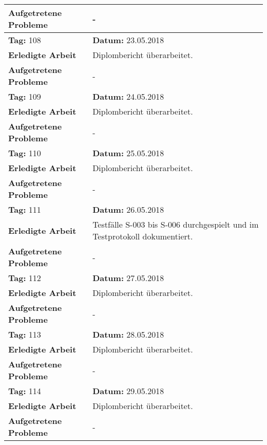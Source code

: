 \begin{longtable}{|p{5cm}|p{5cm}p{6cm}|}
\textbf{Aufgetretene Probleme} & \multicolumn{2}{p{11cm}|}{-} \\ \hline
\rowcolor{heading}\textbf{Tag:} 108 & \textbf{Datum:} 23.05.2018 & \\ \hline
\textbf{Erledigte Arbeit} & \multicolumn{2}{p{11cm}|}{Diplombericht überarbeitet.} \\ \hline
\textbf{Aufgetretene Probleme} & \multicolumn{2}{p{11cm}|}{-} \\ \hline
\rowcolor{heading}\textbf{Tag:} 109 & \textbf{Datum:} 24.05.2018 & \\ \hline
\textbf{Erledigte Arbeit} & \multicolumn{2}{p{11cm}|}{Diplombericht überarbeitet.} \\ \hline
\textbf{Aufgetretene Probleme} & \multicolumn{2}{p{11cm}|}{-} \\ \hline
\rowcolor{heading}\textbf{Tag:} 110 & \textbf{Datum:} 25.05.2018 & \\ \hline
\textbf{Erledigte Arbeit} & \multicolumn{2}{p{11cm}|}{Diplombericht überarbeitet.} \\ \hline
\textbf{Aufgetretene Probleme} & \multicolumn{2}{p{11cm}|}{-} \\ \hline
\rowcolor{heading}\textbf{Tag:} 111 & \textbf{Datum:} 26.05.2018 & \\ \hline
\textbf{Erledigte Arbeit} & \multicolumn{2}{p{11cm}|}{Testfälle S-003 bis S-006 durchgespielt und im Testprotokoll dokumentiert.} \\ \hline
\textbf{Aufgetretene Probleme} & \multicolumn{2}{p{11cm}|}{-} \\ \hline
\rowcolor{heading}\textbf{Tag:} 112 & \textbf{Datum:} 27.05.2018 & \\ \hline
\textbf{Erledigte Arbeit} & \multicolumn{2}{p{11cm}|}{Diplombericht überarbeitet.} \\ \hline
\textbf{Aufgetretene Probleme} & \multicolumn{2}{p{11cm}|}{-} \\ \hline
\rowcolor{heading}\textbf{Tag:} 113 & \textbf{Datum:} 28.05.2018 & \\ \hline
\textbf{Erledigte Arbeit} & \multicolumn{2}{p{11cm}|}{Diplombericht überarbeitet.} \\ \hline
\textbf{Aufgetretene Probleme} & \multicolumn{2}{p{11cm}|}{-} \\ \hline
\rowcolor{heading}\textbf{Tag:} 114 & \textbf{Datum:} 29.05.2018 & \\ \hline
\textbf{Erledigte Arbeit} & \multicolumn{2}{p{11cm}|}{Diplombericht überarbeitet.} \\ \hline
\textbf{Aufgetretene Probleme} & \multicolumn{2}{p{11cm}|}{-} \\ \hline

\end{longtable}
